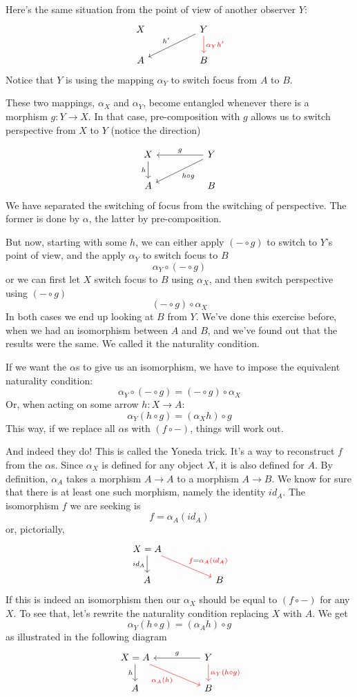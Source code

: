 \documentclass[DaoFP]{subfiles}
\begin{document}
Here's the same situation from the point of view of another observer $Y$:
\[
 \begin{tikzcd}
 X
  && Y
 \arrow[lld, "h'"']
 \arrow[d, red, "\alpha_Y h'"]
 \\
 A
  && B
 \end{tikzcd}
\]
Notice that $Y$ is using the mapping $\alpha_Y$ to switch focus from $A$ to $B$. 

These two mappings, $\alpha_X$ and $\alpha_Y$, become entangled whenever there is a morphism $g \colon Y \to X$. In that case, pre-composition with $g$ allows us to switch perspective from $X$ to $Y$ (notice the direction)

\[
 \begin{tikzcd}
 X
 \arrow[d, "h"']
 && Y
 \arrow[ll, "g"']
 \arrow[lld, "h \circ g"]
 \\
 A
  && B
 \end{tikzcd}
\]
We have separated the switching of focus from the switching of perspective. The former is done by $\alpha$, the latter by pre-composition.

But now, starting with some $h$, we can either apply $(- \circ g)$ to switch to $Y$'s point of view, and the apply $\alpha_Y$ to switch focus to $B$
\[ \alpha_Y \circ (- \circ g) \]
or we can first let $X$ switch focus to $B$ using $\alpha_X$, and then switch perspective using $(- \circ g)$
\[ (- \circ g) \circ \alpha_X \]
In both cases we end up looking at $B$ from $Y$. We've done this exercise before, when we had an isomorphism between $A$ and $B$, and we've found out that the results were the same. We called it the naturality condition. 

If we want the $\alpha$s to give us an isomorphism, we have to impose the equivalent naturality condition:
\[ \alpha_Y \circ (- \circ g) = (- \circ g) \circ \alpha_X \]
Or, when acting on some arrow $h \colon X \to A$:
\[\alpha_Y(h \circ g) = (\alpha_X h) \circ g \]
This way, if we replace all $\alpha$s with $(f \circ -)$, things will work out. 

And indeed they do! This is called the Yoneda trick. It's a way to reconstruct $f$ from the $\alpha$s. Since $\alpha_X$ is defined for any object $X$, it is also defined for $A$. By definition, $\alpha_A$ takes a morphism $A \to A$ to a morphism $A \to B$. We know for sure that there is at least one such morphism, namely the identity $id_A$. The isomorphism $f$ we are seeking is
\[f = \alpha_A (id_A)\]
or, pictorially,
\[
 \begin{tikzcd}
X = A
 \arrow[d, "id_A"']
 \arrow[rrd, red, "f = \alpha_A (id_A)"]
  \\
 A
  && B
 \end{tikzcd}
\]
If this is indeed an isomorphism then our $\alpha_X$ should be equal to  $(f \circ -)$ for any $X$. To see that, let's rewrite the naturality condition replacing $X$ with $A$. We get
\[\alpha_Y(h \circ g) = (\alpha_A h) \circ g \]
as illustrated in the following diagram
\[
 \begin{tikzcd}
 X = A
 \arrow[d, "h"']
 \arrow[rrd,  red, "\alpha_A (h)"']
 && Y
 \arrow[ll, "g"']
 \arrow[d, red, "\alpha_Y (h \circ g)"]
   \\
 A
  && B
 \end{tikzcd}
\]
\end{document}
